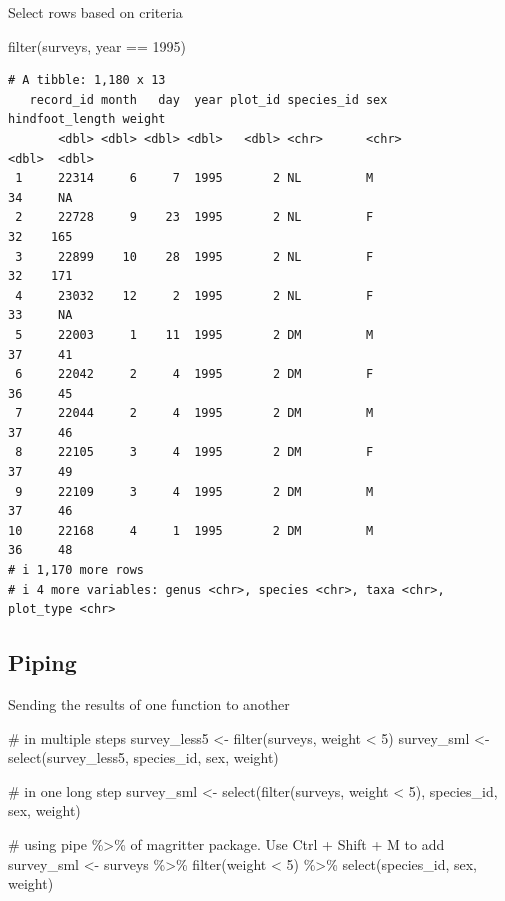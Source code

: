 \documentclass[
  letterpaper,
  DIV=11,
  numbers=noendperiod]{scrreprt}
\newenvironment{Shaded}{\begin{snugshade}}{\end{snugshade}}
\newcommand{\CommentTok}[1]{\textcolor[rgb]{0.37,0.37,0.37}{#1}}
\newcommand{\DecValTok}[1]{\textcolor[rgb]{0.68,0.00,0.00}{#1}}
\newcommand{\FunctionTok}[1]{\textcolor[rgb]{0.28,0.35,0.67}{#1}}
\newcommand{\NormalTok}[1]{\textcolor[rgb]{0.00,0.23,0.31}{#1}}
\newcommand{\OtherTok}[1]{\textcolor[rgb]{0.00,0.23,0.31}{#1}}
\newcommand{\SpecialCharTok}[1]{\textcolor[rgb]{0.37,0.37,0.37}{#1}}
\begin{document}
Select rows based on criteria

\begin{Shaded}
\begin{Highlighting}[]
\FunctionTok{filter}\NormalTok{(surveys, year }\SpecialCharTok{==} \DecValTok{1995}\NormalTok{)}
\end{Highlighting}
\end{Shaded}

\begin{verbatim}
# A tibble: 1,180 x 13
   record_id month   day  year plot_id species_id sex   hindfoot_length weight
       <dbl> <dbl> <dbl> <dbl>   <dbl> <chr>      <chr>           <dbl>  <dbl>
 1     22314     6     7  1995       2 NL         M                  34     NA
 2     22728     9    23  1995       2 NL         F                  32    165
 3     22899    10    28  1995       2 NL         F                  32    171
 4     23032    12     2  1995       2 NL         F                  33     NA
 5     22003     1    11  1995       2 DM         M                  37     41
 6     22042     2     4  1995       2 DM         F                  36     45
 7     22044     2     4  1995       2 DM         M                  37     46
 8     22105     3     4  1995       2 DM         F                  37     49
 9     22109     3     4  1995       2 DM         M                  37     46
10     22168     4     1  1995       2 DM         M                  36     48
# i 1,170 more rows
# i 4 more variables: genus <chr>, species <chr>, taxa <chr>, plot_type <chr>
\end{verbatim}

\subsection{Piping}\label{piping}

Sending the results of one function to another

\begin{Shaded}
\begin{Highlighting}[]
\CommentTok{\# in multiple steps}
\NormalTok{survey\_less5 }\OtherTok{\textless{}{-}} \FunctionTok{filter}\NormalTok{(surveys, weight }\SpecialCharTok{\textless{}} \DecValTok{5}\NormalTok{)}
\NormalTok{survey\_sml }\OtherTok{\textless{}{-}} \FunctionTok{select}\NormalTok{(survey\_less5, species\_id, sex, weight)}

\CommentTok{\# in one long step}
\NormalTok{survey\_sml }\OtherTok{\textless{}{-}} \FunctionTok{select}\NormalTok{(}\FunctionTok{filter}\NormalTok{(surveys, weight }\SpecialCharTok{\textless{}} \DecValTok{5}\NormalTok{), species\_id, sex, weight)}

\CommentTok{\# using pipe \%\textgreater{}\% of magritter package.  Use Ctrl + Shift + M to add}
\NormalTok{survey\_sml }\OtherTok{\textless{}{-}}\NormalTok{ surveys }\SpecialCharTok{\%\textgreater{}\%}
  \FunctionTok{filter}\NormalTok{(weight }\SpecialCharTok{\textless{}} \DecValTok{5}\NormalTok{) }\SpecialCharTok{\%\textgreater{}\%}
  \FunctionTok{select}\NormalTok{(species\_id, sex, weight)}
\end{Highlighting}
\end{Shaded}
\end{document}
